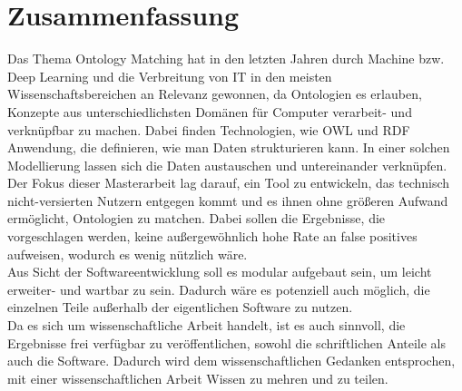 %
\chapter{Zusammenfassung}
\label{chap:conclusion}      

Das Thema Ontology Matching hat in den letzten Jahren durch Machine bzw. Deep
Learning und die Verbreitung von IT in den meisten Wissenschaftsbereichen an
Relevanz gewonnen, da Ontologien es erlauben, Konzepte aus unterschiedlichsten
Domänen für Computer verarbeit- und verknüpfbar zu machen. Dabei
finden Technologien, wie OWL und RDF Anwendung, die definieren, wie man Daten
strukturieren kann. In einer solchen Modellierung lassen sich die Daten
austauschen und untereinander verknüpfen.\\
Der Fokus dieser Masterarbeit lag darauf, ein Tool zu entwickeln, das technisch
nicht-versierten Nutzern entgegen kommt und es ihnen ohne größeren Aufwand
ermöglicht, Ontologien zu matchen. Dabei sollen die Ergebnisse, die
vorgeschlagen werden, keine außergewöhnlich hohe Rate an false positives
aufweisen, wodurch es wenig nützlich wäre.\\
Aus Sicht der Softwareentwicklung soll es modular aufgebaut sein, um leicht
erweiter- und wartbar zu sein. Dadurch wäre es potenziell auch möglich, die
einzelnen Teile außerhalb der eigentlichen Software zu nutzen.\\
Da es sich um wissenschaftliche Arbeit handelt, ist es auch sinnvoll, die
Ergebnisse frei verfügbar zu veröffentlichen, sowohl die schriftlichen Anteile
als auch die Software. Dadurch wird dem wissenschaftlichen Gedanken entsprochen,
mit einer wissenschaftlichen Arbeit Wissen zu mehren und zu teilen.

